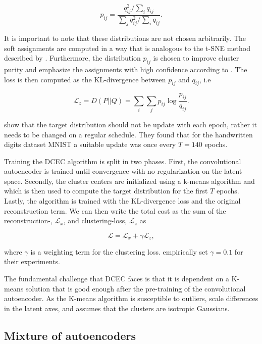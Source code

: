 \begin{equation}
p_{ij} = \frac{q_{ij}^2/\sum_i q_{ij}}{\sum_j q_{ij}^2/\sum_i q_{ij}}.
\end{equation}

\noindent It is important to note that these distributions are not chosen arbitrarily. The soft assignments are computed in a way that is analogous to the t-SNE method described by \citet{VanDerMaaten2008}. Furthermore, the distribution $p_{ij}$ is chosen to improve cluster purity and emphasize the assignments with high confidence according to \cite{Xie2016}. The loss is then computed as the KL-divergence between $p_{ij}$ and $q_{ij}$, i.e

\begin{equation}
\mathcal{L}_z = D(P ||Q ) = \sum_i \sum_j p_{ij} \log \frac{p_{ij}}{q_{ij}}.
\end{equation} 

\noindent \citet{Guo2017} show that the target distribution should not be update with each epoch, rather it needs to be changed on a regular schedule. They found that for the handwritten digits dataset MNIST a suitable update was once every $T=140$ epochs. 

Training the DCEC algorithm is split in two phases. First, the convolutional autoencoder is trained until convergence with no regularization on the latent space. Secondly, the cluster centers are initialized using a k-means algorithm and which is then used to compute the target distribution for the first $T$ epochs. Lastly, the algorithm is trained with the KL-divergence loss and the original reconstruction term. We can then write the total cost as the sum of the reconstruction-, $\mathcal{L}_x$, and clustering-loss, $\mathcal{L}_z$ as 

\begin{equation}
\mathcal{L} = \mathcal{L}_x + \gamma \mathcal{L}_z,
\end{equation}

\noindent where $\gamma$ is a weighting term for the clustering loss. \cite{Guo2017} empirically set $\gamma=0.1$ for their experiments. 

The fundamental challenge that DCEC faces is that it is dependent on a K-means solution that is good enough after the pre-training of the convolutional autoencoder. As the K-means algorithm is susceptible to outliers, scale differences in the latent axes,  and assumes that the clusters are isotropic Gaussians. 

\subsection{Mixture of autoencoders}

